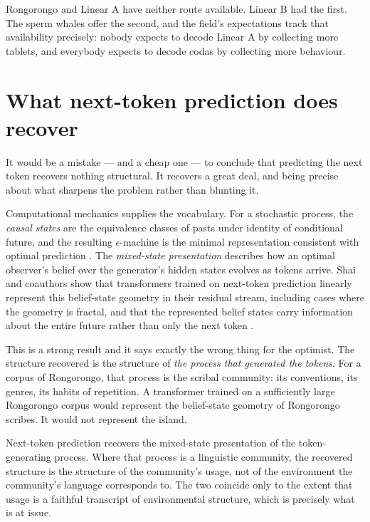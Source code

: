 \noindent
Rongorongo and Linear A have neither route available.
Linear B had the first.
The sperm whales offer the second, and the field's expectations
track that availability precisely: nobody expects to decode Linear
A by collecting more tablets, and everybody expects to decode codas
by collecting more behaviour.

\section{What next-token prediction does recover}
\label{sec:recovers}

It would be a mistake --- and a cheap one --- to conclude that
predicting the next token recovers nothing structural.
It recovers a great deal, and being precise about what sharpens the
problem rather than blunting it.

Computational mechanics supplies the vocabulary.
For a stochastic process, the \emph{causal states} are the
equivalence classes of pasts under identity of conditional future,
and the resulting $\epsilon$-machine is the minimal representation
consistent with optimal prediction \cite{shalizi2001}.
The \emph{mixed-state presentation} describes how an optimal
observer's belief over the generator's hidden states evolves as
tokens arrive.
Shai and coauthors show that transformers trained on next-token
prediction linearly represent this belief-state geometry in their
residual stream, including cases where the geometry is fractal, and
that the represented belief states carry information about the
entire future rather than only the next token \cite{shai2024}.

This is a strong result and it says exactly the wrong thing for the
optimist.
The structure recovered is the structure of \emph{the process that
generated the tokens}.
For a corpus of Rongorongo, that process is the scribal community:
its conventions, its genres, its habits of repetition.
A transformer trained on a sufficiently large Rongorongo corpus
would represent the belief-state geometry of Rongorongo scribes.
It would not represent the island.

\begin{observation}
\label{obs:generator}
Next-token prediction recovers the mixed-state presentation of the
token-generating process.
Where that process is a linguistic community, the recovered
structure is the structure of the community's usage, not of the
environment the community's language corresponds to.
The two coincide only to the extent that usage is a faithful
transcript of environmental structure, which is precisely what is
at issue.
\end{observation}

